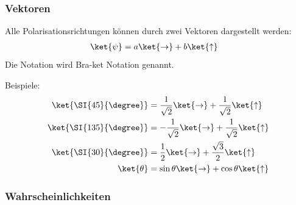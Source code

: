 \documentclass{beamer}
\begin{document}
\begin{frame}
\frametitle{Vektoren}
Alle Polarisationsrichtungen können durch zwei Vektoren dargestellt werden:
\begin{align*}
	\ket{\psi} &= a\ket{\to} + b\ket{\uparrow}
\end{align*}
Die Notation wird Bra-ket Notation genannt.

Beispiele:
\begin{align*}
	\ket{\SI{45}{\degree}} &= \frac{1}{\sqrt2}\ket{\to} + \frac{1}{\sqrt2}\ket{\uparrow}
	\\
	\ket{\SI{135}{\degree}} &= -\frac{1}{\sqrt2}\ket{\to} + \frac{1}{\sqrt2}\ket{\uparrow}
	\\
	\ket{\SI{30}{\degree}} &= \frac{1}{2}\ket{\to} + \frac{\sqrt3}{2}\ket{\uparrow}
	\\
	\ket{\theta} &= \sin\theta\ket{\to} + \cos\theta\ket{\uparrow}
\end{align*}
\end{frame}

\begin{frame}
\frametitle{Wahrscheinlichkeiten}
\end{frame}
\end{document}
